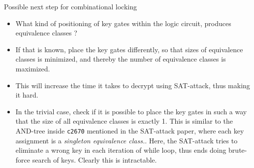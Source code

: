 \begin{frame}{Possible next step for combinational locking}
	\begin{itemize}
		\item What kind of positioning of key gates within the logic circuit, produces equivalence classes ?
		\item If that is known, place the key gates differently, so that sizes of equivalence classes is minimized, and thereby the number of equivalence classes is maximized. 
		\item This will increase the time it takes to decrypt using SAT-attack, thus making it hard.
		\item In the trivial case, check if it is possible to place the key gates in such a way that the size of all equivalence classes is exactly 1. This is similar to the AND-tree inside \texttt{c2670} mentioned in the SAT-attack paper, where each key assignment is a {\it singleton equivalence class.}. Here, the SAT-attack tries to eliminate a wrong key in each iteration of while loop, thus ends doing brute-force search of keys. Clearly this is intractable. 
	\end{itemize}
\end{frame}
